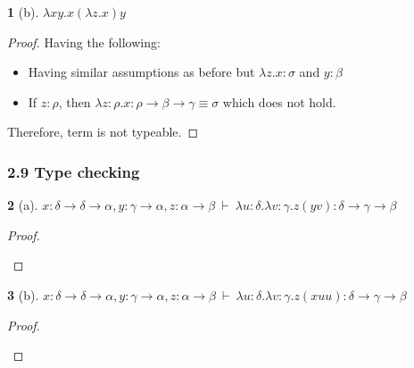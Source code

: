 \documentclass[12pt, a4paper]{article}
\newcommand{\deriv}{\ \vdash\ }
\newtheorem*{exercise}{}
\begin{document}
\begin{exercise}[b]
    $\lambda xy. x(\lambda z. x)y$
\end{exercise}
\begin{proof}
    Having the following:
    \begin{itemize}
        \item Having similar assumptions as before but $\lambda z. x : \sigma$ and $y : \beta$
        \item If $z : \rho$, then $\lambda z : \rho. x : \rho \to \beta \to \gamma \equiv \sigma$ which does not hold.
    \end{itemize}
    Therefore, term is not typeable.
\end{proof}

\subsubsection{2.9 Type checking}
\begin{exercise}[a]
    $x : \delta \to \delta \to \alpha, y : \gamma \to \alpha, z : \alpha \to \beta \deriv \lambda u : \delta . \lambda v : \gamma . z(yv) : \delta \to \gamma \to \beta$
\end{exercise}
\begin{proof}
  \begin{flagderiv}
  \end{flagderiv}
\end{proof}

\begin{exercise}[b]
    $x : \delta \to \delta \to \alpha, y : \gamma \to \alpha, z : \alpha \to \beta \deriv \lambda u : \delta . \lambda v : \gamma . z(xuu) : \delta \to \gamma \to \beta$
\end{exercise}
\begin{proof}
  \begin{flagderiv}
  \end{flagderiv}
\end{proof}
\end{document}
